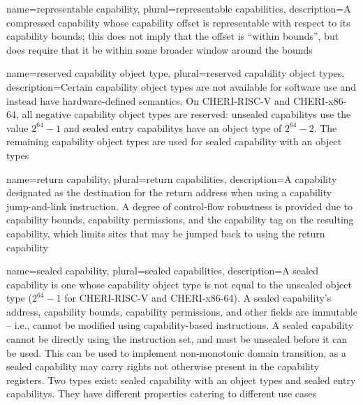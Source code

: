{
  name=representable capability,
  plural=representable capabilities,
  description={A \gls{compressed capability} whose \gls{capability offset}
    is representable with respect to its \gls{capability bounds}; this
    does not imply that the offset is ``within bounds'', but does require
    that it be within some broader window around the bounds}
}

{
  name=reserved capability object type,
  plural=reserved capability object types,
  description={Certain \glspl{capability object type} are not available for software use and instead have hardware-defined semantics.
  On \gls{CHERI-RISC-V} and \gls{CHERI-x86-64}, all negative \glspl{capability object type} are
  reserved: \glspl{unsealed capability} use the value $2^{64}-1$ and \glspl{sealed entry capability}
  have an object type of $2^{64}-2$.
  The remaining \glspl{capability object type} are used for \glspl{sealed capability with an object type}}
}

{
  name=return capability,
  plural=return capabilities,
  description={A \gls{capability} designated as the destination for the
    return address when using a capability jump-and-link instruction.
    A degree of \gls{control-flow robustness} is provided due to
    \gls{capability bounds}, \gls{capability permissions}, and the
    \gls{capability tag} on the resulting capability, which limits sites that
    may be jumped back to using the return capability}
}

{
  name=sealed capability,
  plural=sealed capabilities,
  description={A sealed \gls{capability} is one whose \gls{capability object type}
    is not equal to the unsealed object type ($2^{64}-1$ for \gls{CHERI-RISC-V} and \gls{CHERI-x86-64}).
    A sealed capability's \gls{address}, \gls{capability bounds},
    \gls{capability permissions}, and other fields are immutable -- i.e.,
    cannot be modified using \gls{capability-based instructions}.
    A sealed capability cannot be directly 
    using the instruction set, and must be unsealed before it can be used.
    This can be used to implement non-monotonic domain transition, as a
    sealed capability may carry rights not otherwise present in the
    \glspl{capability register}.
    Two types exist: \glspl{sealed capability with an object type} and
    \glspl{sealed entry capability}.
    They have different properties catering to different use cases}
}

